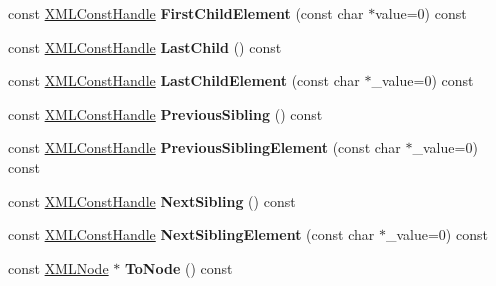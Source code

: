 \begin{DoxyCompactItemize}
\item 
\mbox{\label{classtinyxml2_1_1XMLConstHandle_a881276716eff6262956dca852db43b1c}} 
const \hyperlink{classtinyxml2_1_1XMLConstHandle}{X\+M\+L\+Const\+Handle} {\bfseries First\+Child\+Element} (const char $\ast$value=0) const
\item 
\mbox{\label{classtinyxml2_1_1XMLConstHandle_a908436124990f3d7b35cb7df20d31d9e}} 
const \hyperlink{classtinyxml2_1_1XMLConstHandle}{X\+M\+L\+Const\+Handle} {\bfseries Last\+Child} () const
\item 
\mbox{\label{classtinyxml2_1_1XMLConstHandle_aea84de60dadee03c994a817b23eac150}} 
const \hyperlink{classtinyxml2_1_1XMLConstHandle}{X\+M\+L\+Const\+Handle} {\bfseries Last\+Child\+Element} (const char $\ast$\+\_\+value=0) const
\item 
\mbox{\label{classtinyxml2_1_1XMLConstHandle_acf68cc7930e4ac883e0c7e16ef2fbb66}} 
const \hyperlink{classtinyxml2_1_1XMLConstHandle}{X\+M\+L\+Const\+Handle} {\bfseries Previous\+Sibling} () const
\item 
\mbox{\label{classtinyxml2_1_1XMLConstHandle_acfe59366330bf4744bb8ec285d723d66}} 
const \hyperlink{classtinyxml2_1_1XMLConstHandle}{X\+M\+L\+Const\+Handle} {\bfseries Previous\+Sibling\+Element} (const char $\ast$\+\_\+value=0) const
\item 
\mbox{\label{classtinyxml2_1_1XMLConstHandle_aec3710e455f41014026ef17fbbb0efb3}} 
const \hyperlink{classtinyxml2_1_1XMLConstHandle}{X\+M\+L\+Const\+Handle} {\bfseries Next\+Sibling} () const
\item 
\mbox{\label{classtinyxml2_1_1XMLConstHandle_a81914a531ed7fd7488edaba584a5d1ca}} 
const \hyperlink{classtinyxml2_1_1XMLConstHandle}{X\+M\+L\+Const\+Handle} {\bfseries Next\+Sibling\+Element} (const char $\ast$\+\_\+value=0) const
\item 
\mbox{\label{classtinyxml2_1_1XMLConstHandle_a61812760cb08bc1b050e65b73a08457b}} 
const \hyperlink{classtinyxml2_1_1XMLNode}{X\+M\+L\+Node} $\ast$ {\bfseries To\+Node} () const

\end{DoxyCompactItemize}
